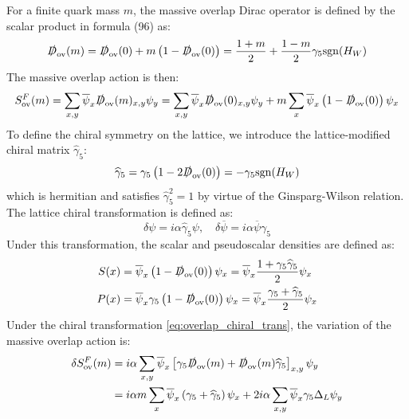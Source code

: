 For a finite quark mass $m$, the massive overlap Dirac operator is defined by the scalar product in formula (96) as:
\begin{equation}
\slashed{D}_{\mathrm{ov}}(m) = \slashed{D}_{\mathrm{ov}}(0) + m \left( 1 - \slashed{D}_{\mathrm{ov}}(0) \right) = \frac{1+m}{2} + \frac{1-m}{2} \gamma_5 \mathrm{sgn}(H_W)
\label{eq:overlap_operator_massive}
\end{equation}
The massive overlap action is then:
\begin{equation}
S_{\mathrm{ov}}^F(m) = \sum_{x,y} \overline{\psi}_x \slashed{D}_{\mathrm{ov}}(m)_{x,y} \psi_y = \sum_{x,y} \overline{\psi}_x \slashed{D}_{\mathrm{ov}}(0)_{x,y} \psi_y + m \sum_x \overline{\psi}_x \left( 1 - \slashed{D}_{\mathrm{ov}}(0) \right) \psi_x
\label{eq:overlap_action_massive}
\end{equation}
To define the chiral symmetry on the lattice, we introduce the lattice-modified chiral matrix $\widehat{\gamma}_5$:
\begin{equation}
\widehat{\gamma}_5 = \gamma_5 \left( 1 - 2 \slashed{D}_{\mathrm{ov}}(0) \right) = -\gamma_5 \mathrm{sgn}(H_W)
\label{eq:hat_gamma_5}
\end{equation}
which is hermitian and satisfies $\widehat{\gamma}_5^2 = 1$ by virtue of the Ginsparg-Wilson relation. The lattice chiral transformation is defined as:
\begin{equation}
\delta \psi = i \alpha \widehat{\gamma}_5 \psi, \quad \delta \overline{\psi} = i \alpha \overline{\psi} \gamma_5
\label{eq:overlap_chiral_trans}
\end{equation}
Under this transformation, the scalar and pseudoscalar densities are defined as:
\begin{align}
S(x) &= \overline{\psi}_x \left( 1 - \slashed{D}_{\mathrm{ov}}(0) \right) \psi_x = \overline{\psi}_x \frac{1 + \gamma_5 \widehat{\gamma}_5}{2} \psi_x \\
P(x) &= \overline{\psi}_x \gamma_5 \left( 1 - \slashed{D}_{\mathrm{ov}}(0) \right) \psi_x = \overline{\psi}_x \frac{\gamma_5 + \widehat{\gamma}_5}{2} \psi_x
\label{eq:overlap_densities}
\end{align}
Under the chiral transformation \eqref{eq:overlap_chiral_trans}, the variation of the massive overlap action is:
\begin{equation}
\begin{split}
\delta S_{\mathrm{ov}}^F(m) &= i\alpha \sum_{x,y} \overline{\psi}_x \left[ \gamma_5 \slashed{D}_{\mathrm{ov}}(m) + \slashed{D}_{\mathrm{ov}}(m) \widehat{\gamma}_5 \right]_{x,y} \psi_y \\
&= i\alpha m \sum_x \overline{\psi}_x \left( \gamma_5 + \widehat{\gamma}_5 \right) \psi_x + 2 i \alpha \sum_{x,y} \overline{\psi}_x \gamma_5 \Delta_L \psi_y
\end{split}
\label{eq:overlap_action_variation}
\end{equation}
